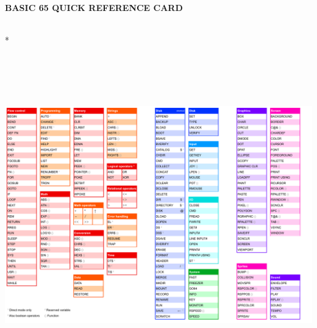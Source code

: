 \hypersetup{colorlinks=false}
\tableofcontents



\cleardoublepage
{}








\appendix
  
  
  
  
  
  
  

\printindex

\cleardoublepage

\pagestyle{empty}
\newpage
{\raggedright\huge\bf\color{headingblue} BASIC 65 QUICK REFERENCE CARD}
\vspace{12pt}
\\*
\includegraphics[angle=90,origin=c,height=5.75in]{images/illustrations/basic65_quick_reference_card.pdf}


